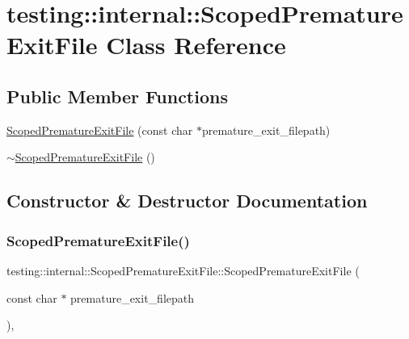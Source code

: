 \hypertarget{classtesting_1_1internal_1_1_scoped_premature_exit_file}{}\section{testing\+:\+:internal\+:\+:Scoped\+Premature\+Exit\+File Class Reference}
\label{classtesting_1_1internal_1_1_scoped_premature_exit_file}
\subsection*{Public Member Functions}
\begin{DoxyCompactItemize}
\item 
\hyperlink{classtesting_1_1internal_1_1_scoped_premature_exit_file_ae520883b8a6984a864ce675acedff4a2}{Scoped\+Premature\+Exit\+File} (const char $\ast$premature\+\_\+exit\+\_\+filepath)
\item 
\hyperlink{classtesting_1_1internal_1_1_scoped_premature_exit_file_afa2ddc9bc1c2a90fd0dd82bb11fddc79}{$\sim$\+Scoped\+Premature\+Exit\+File} ()
\end{DoxyCompactItemize}


\subsection{Constructor \& Destructor Documentation}
\mbox{\label{classtesting_1_1internal_1_1_scoped_premature_exit_file_ae520883b8a6984a864ce675acedff4a2}} 
\subsubsection{\texorpdfstring{Scoped\+Premature\+Exit\+File()}{ScopedPrematureExitFile()}}
{\footnotesize\ttfamily testing\+::internal\+::\+Scoped\+Premature\+Exit\+File\+::\+Scoped\+Premature\+Exit\+File (\begin{DoxyParamCaption}\item[{const char $\ast$}]{premature\+\_\+exit\+\_\+filepath }\end{DoxyParamCaption})\hspace{0.3cm}{\ttfamily [inline]}, {\ttfamily [explicit]}}

